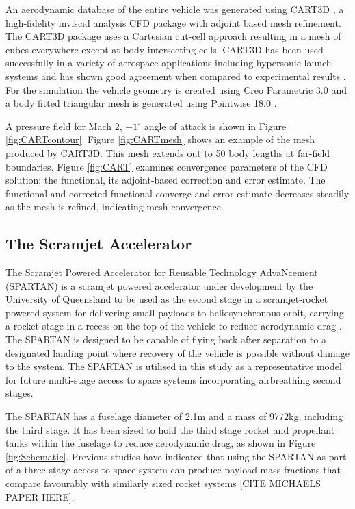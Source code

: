 \documentclass[]{aiaa-tc}
\begin{document}
An aerodynamic database of the entire vehicle was generated using CART3D \cite{CART3D}, a high-fidelity inviscid analysis CFD package with adjoint based mesh refinement. The CART3D package uses a Cartesian cut-cell approach \cite{Aftosmis1997} resulting in a mesh of cubes everywhere except at body-intersecting cells. CART3D has been used successfully in a variety of aerospace applications including hypersonic launch systems \cite{Mehta2015} and has shown good agreement when compared to experimental results \cite{Aftosmis2011}.
For the simulation the vehicle geometry is created using Creo Parametric 3.0 \cite{CREO} and a body fitted triangular mesh is generated using Pointwise 18.0 \cite{Pointwise}.


A pressure field for Mach 2, $-1^\circ$ angle of attack is shown in Figure \ref{fig:CARTcontour}. Figure \ref{fig:CARTmesh} shows an example of the mesh produced by CART3D. This mesh extends out to 50 body lengths at far-field boundaries. Figure \ref{fig:CART} examines convergence parameters of the CFD solution; the functional, its adjoint-based correction and error estimate. The functional and corrected functional converge and error estimate decreases steadily as the mesh is refined, indicating mesh convergence.




\subsection{The Scramjet Accelerator}
The Scramjet Powered Accelerator for Reusable Technology AdvaNcement (SPARTAN) is a scramjet powered accelerator under development by the University of Queensland to be used as the second stage in a scramjet-rocket powered system for delivering small payloads to heliosynchronous orbit, carrying a rocket stage in a recess on the top of the vehicle to reduce aerodynamic drag \cite{Preller2015a,Jazra2013}. The SPARTAN is designed to be capable of flying back after separation to a designated landing point where recovery of the vehicle is possible without damage to the system.  The SPARTAN is utilised in this study as a representative model for future multi-stage access to space systems incorporating airbreathing second stages.




The SPARTAN has a fuselage diameter of 2.1m and a mass of 9772kg, including the third stage. It has been sized to hold the third stage rocket and propellant tanks within the fuselage to reduce aerodynamic drag, as shown in Figure \ref{fig:Schematic}. Previous studies have indicated that using the SPARTAN as part of a three stage access to space system can produce payload mass fractions that compare favourably with similarly sized rocket systems \cite{Preller2015a} [CITE MICHAELS PAPER HERE]. 
\end{document}

